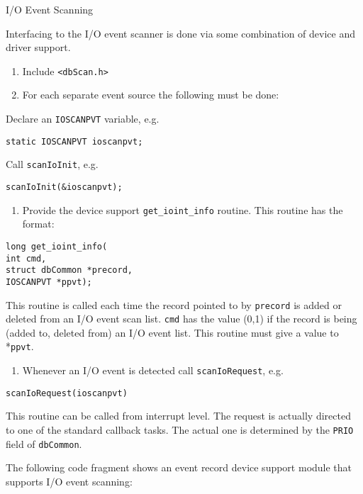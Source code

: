 I/O Event Scanning

Interfacing to the I/O event scanner is done via some combination of device and driver support.

\begin{enumerate}\item Include \verb|<dbScan.h>|

\item For each separate event source the following must be done:

\end{enumerate}Declare an \verb|IOSCANPVT| variable, e.g.

\begin{verbatim}static IOSCANPVT ioscanpvt;
\end{verbatim}Call \verb|scanIoInit|, e.g.

\begin{verbatim}scanIoInit(&ioscanpvt);
\end{verbatim}\begin{enumerate}\item Provide the device support \verb|get_ioint_info| routine. This routine has the format:

\end{enumerate}\begin{verbatim}long get_ioint_info(
int cmd,
struct dbCommon *precord,
IOSCANPVT *ppvt);
\end{verbatim}\begin{description}\item This routine is called each time the record pointed to by \verb|precord| is added or deleted from an I/O event scan list. 
\verb|cmd| has the value (0,1) if the record is being (added to, deleted from) an I/O event list. This routine must give a 
value to *\verb|ppvt|.

\end{description}\begin{enumerate}\item Whenever an I/O event is detected call \verb|scanIoRequest|, e.g.

\end{enumerate}\begin{verbatim}scanIoRequest(ioscanpvt)
\end{verbatim}\begin{description}\item This routine can be called from interrupt level. The request is actually directed to one of the standard callback 
tasks. The actual one is determined by the \verb|PRIO| field of \verb|dbCommon|. 

\end{description}The following code fragment shows an event record device support module that supports I/O event scanning: 

